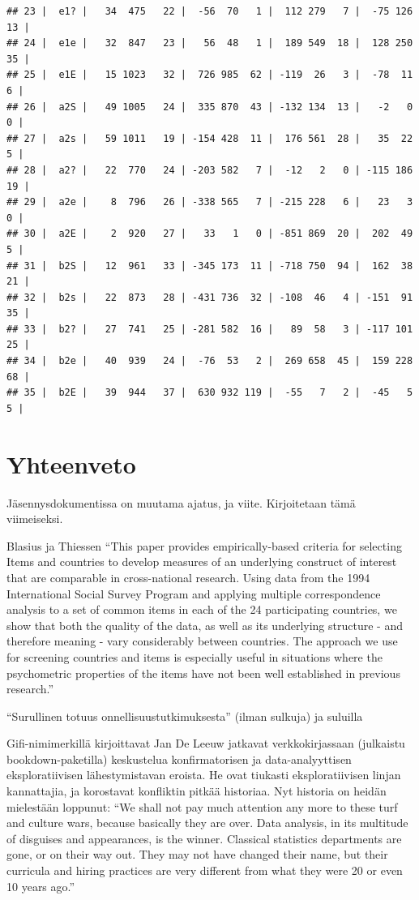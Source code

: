 \documentclass[
  finnish,
]{book}
\begin{document}
\begin{verbatim}
## 23 |  e1? |   34  475   22 |  -56  70   1 |  112 279   7 |  -75 126  13 |
## 24 |  e1e |   32  847   23 |   56  48   1 |  189 549  18 |  128 250  35 |
## 25 |  e1E |   15 1023   32 |  726 985  62 | -119  26   3 |  -78  11   6 |
## 26 |  a2S |   49 1005   24 |  335 870  43 | -132 134  13 |   -2   0   0 |
## 27 |  a2s |   59 1011   19 | -154 428  11 |  176 561  28 |   35  22   5 |
## 28 |  a2? |   22  770   24 | -203 582   7 |  -12   2   0 | -115 186  19 |
## 29 |  a2e |    8  796   26 | -338 565   7 | -215 228   6 |   23   3   0 |
## 30 |  a2E |    2  920   27 |   33   1   0 | -851 869  20 |  202  49   5 |
## 31 |  b2S |   12  961   33 | -345 173  11 | -718 750  94 |  162  38  21 |
## 32 |  b2s |   22  873   28 | -431 736  32 | -108  46   4 | -151  91  35 |
## 33 |  b2? |   27  741   25 | -281 582  16 |   89  58   3 | -117 101  25 |
## 34 |  b2e |   40  939   24 |  -76  53   2 |  269 658  45 |  159 228  68 |
## 35 |  b2E |   39  944   37 |  630 932 119 |  -55   7   2 |  -45   5   5 |
\end{verbatim}

\hypertarget{yhteenveto}{%
\chapter{Yhteenveto}\label{yhteenveto}}

Jäsennysdokumentissa on muutama ajatus, ja viite. Kirjoitetaan tämä viimeiseksi.

Blasius ja Thiessen
``This paper provides empirically-based criteria for selecting Items and countries
to develop measures of an underlying construct of interest that are comparable in
cross-national research. Using data from the 1994 International Social Survey
Program and applying multiple correspondence analysis to a set of common items
in each of the 24 participating countries, we show that both the quality of the
data, as well as its underlying structure - and therefore meaning - vary
considerably between countries. The approach we use for screening countries and
items is especially useful in situations where the psychometric properties of
the items have not been well established in previous research.''
\citep{RefWorks:doc:5b15542ee4b0e2616bc42dca}

``Surullinen totuus onnellisuustutkimuksesta'' \citet{RefWorks:doc:5c223412e4b0508a6674dec0}
(ilman sulkuja) ja suluilla \citep{RefWorks:doc:5c223412e4b0508a6674dec0}

Gifi-nimimerkillä kirjoittavat Jan De Leeuw jatkavat verkkokirjassaan (julkaistu bookdown-paketilla)
\citep{RefWorks:doc:5faaf996e4b05416e98ff547} keskustelua konfirmatorisen ja data-analyyttisen
eksploratiivisen lähestymistavan eroista. He ovat tiukasti eksploratiivisen linjan kannattajia,
ja korostavat konfliktin pitkää historiaa. Nyt historia on heidän mielestään loppunut: ``We shall not pay much attention any more to these turf and culture wars, because basically they are over. Data analysis, in its multitude of disguises and appearances, is the
winner. Classical statistics departments are gone, or on their way out. They may not have changed their
name, but their curricula and hiring practices are very different from what they were 20 or even 10 years
ago.''
\end{document}
